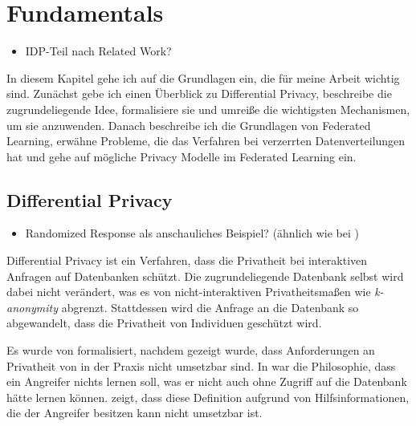 \chapter{Fundamentals}\label{chap:fundamentals}

\begin{itemize}
	\item IDP-Teil nach Related Work?
\end{itemize}

In diesem Kapitel gehe ich auf die Grundlagen ein, die für meine Arbeit wichtig sind. Zunächst gebe ich einen Überblick zu Differential Privacy, beschreibe die zugrundeliegende Idee, formalisiere sie und umreiße die wichtigsten Mechanismen, um sie anzuwenden. Danach beschreibe ich die Grundlagen von Federated Learning, erwähne Probleme, die das Verfahren bei verzerrten Datenverteilungen hat und gehe auf mögliche Privacy Modelle im Federated Learning ein.

\section{Differential Privacy}

\begin{itemize}
	\item Randomized Response als anschauliches Beispiel? (ähnlich wie bei \cite[p.1]{erlingsson:2014}) 
\end{itemize}

Differential Privacy ist ein Verfahren, dass die Privatheit bei interaktiven Anfragen auf Datenbanken schützt. Die zugrundeliegende Datenbank selbst wird dabei nicht verändert, was es von nicht-interaktiven Privatheitsmaßen wie \textit{k-anonymity} abgrenzt. Stattdessen wird die Anfrage an die Datenbank so abgewandelt, dass die Privatheit von Individuen geschützt wird. 

Es wurde von \textcite{dwork:2006} formalisiert, nachdem gezeigt wurde, dass Anforderungen an Privatheit von \textcite{dalenius:1977} in der Praxis nicht umsetzbar sind. In \citeauthor{dalenius:1977} war die Philosophie, dass ein Angreifer nichts lernen soll, was er nicht auch ohne Zugriff auf die Datenbank hätte lernen können. \citeauthor{dwork:2006} zeigt, dass diese Definition aufgrund von Hilfsinformationen, die der Angreifer besitzen kann nicht umsetzbar ist. 

